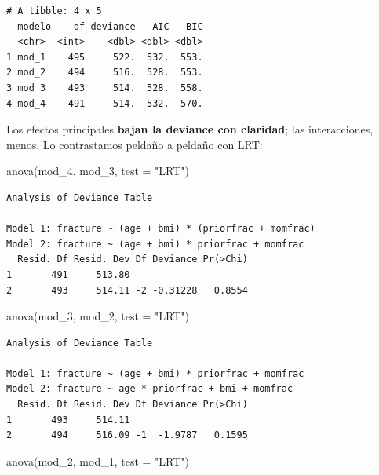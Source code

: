 \documentclass[
  letterpaper,
  DIV=11,
  numbers=noendperiod]{scrartcl}
\newenvironment{Shaded}{\begin{snugshade}}{\end{snugshade}}
\newcommand{\AttributeTok}[1]{\textcolor[rgb]{0.40,0.45,0.13}{#1}}
\newcommand{\FunctionTok}[1]{\textcolor[rgb]{0.28,0.35,0.67}{#1}}
\newcommand{\NormalTok}[1]{\textcolor[rgb]{0.00,0.23,0.31}{#1}}
\newcommand{\StringTok}[1]{\textcolor[rgb]{0.13,0.47,0.30}{#1}}
\begin{document}
\begin{verbatim}
# A tibble: 4 x 5
  modelo    df deviance   AIC   BIC
  <chr>  <int>    <dbl> <dbl> <dbl>
1 mod_1    495     522.  532.  553.
2 mod_2    494     516.  528.  553.
3 mod_3    493     514.  528.  558.
4 mod_4    491     514.  532.  570.
\end{verbatim}

Los efectos principales \textbf{bajan la deviance con claridad}; las
interacciones, menos. Lo contrastamos peldaño a peldaño con LRT:

\begin{Shaded}
\begin{Highlighting}[]
\FunctionTok{anova}\NormalTok{(mod\_4, mod\_3,  }\AttributeTok{test =} \StringTok{"LRT"}\NormalTok{)   }
\end{Highlighting}
\end{Shaded}

\begin{verbatim}
Analysis of Deviance Table

Model 1: fracture ~ (age + bmi) * (priorfrac + momfrac)
Model 2: fracture ~ (age + bmi) * priorfrac + momfrac
  Resid. Df Resid. Dev Df Deviance Pr(>Chi)
1       491     513.80                     
2       493     514.11 -2 -0.31228   0.8554
\end{verbatim}

\begin{Shaded}
\begin{Highlighting}[]
\FunctionTok{anova}\NormalTok{(mod\_3, mod\_2, }\AttributeTok{test =} \StringTok{"LRT"}\NormalTok{)   }
\end{Highlighting}
\end{Shaded}

\begin{verbatim}
Analysis of Deviance Table

Model 1: fracture ~ (age + bmi) * priorfrac + momfrac
Model 2: fracture ~ age * priorfrac + bmi + momfrac
  Resid. Df Resid. Dev Df Deviance Pr(>Chi)
1       493     514.11                     
2       494     516.09 -1  -1.9787   0.1595
\end{verbatim}

\begin{Shaded}
\begin{Highlighting}[]
\FunctionTok{anova}\NormalTok{(mod\_2, mod\_1, }\AttributeTok{test =} \StringTok{"LRT"}\NormalTok{) }
\end{Highlighting}
\end{Shaded}
\end{document}
